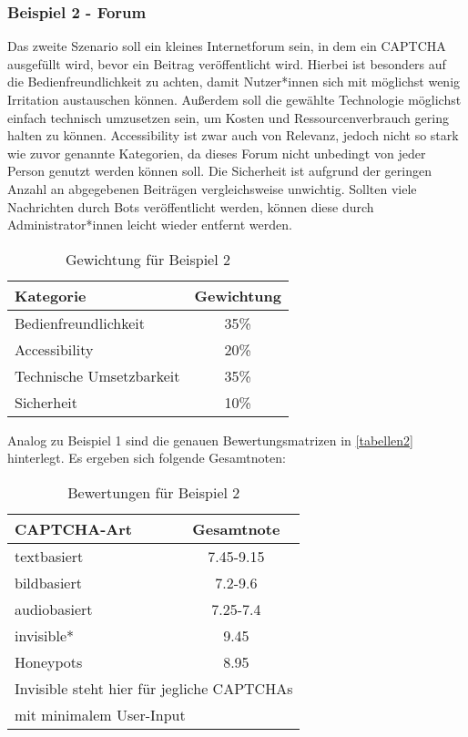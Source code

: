 \subsubsection*{Beispiel 2 - Forum}
Das zweite Szenario soll ein kleines Internetforum sein, in dem ein CAPTCHA ausgefüllt wird, bevor ein Beitrag veröffentlicht wird.
Hierbei ist besonders auf die Bedienfreundlichkeit zu achten, damit Nutzer*innen sich mit möglichst wenig Irritation austauschen können.
Außerdem soll die gewählte Technologie möglichst einfach technisch umzusetzen sein, um Kosten und Ressourcenverbrauch gering halten zu können.
Accessibility ist zwar auch von Relevanz, jedoch nicht so stark wie zuvor genannte Kategorien, da dieses Forum nicht unbedingt von jeder Person genutzt werden können soll.
Die Sicherheit ist aufgrund der geringen Anzahl an abgegebenen Beiträgen vergleichsweise unwichtig.
Sollten viele Nachrichten durch Bots veröffentlicht werden, können diese durch Administrator*innen leicht wieder entfernt werden.

\begin{table}[h!]
    \caption{Gewichtung für Beispiel 2}
    \begin{center}
        \begin{tabular}{l|c}
            Kategorie                       & Gewichtung \\\hline
            Bedienfreundlichkeit            & 35\%         \\
            Accessibility                   & 20\%        \\
            Technische Umsetzbarkeit        & 35\%         \\
            Sicherheit                      & 10\%         
        \end{tabular}
    \end{center}
\end{table}

Analog zu Beispiel 1 sind die genauen Bewertungsmatrizen in \autoref{tabellen2} hinterlegt.
Es ergeben sich folgende Gesamtnoten:

\begin{table}[h!]
    \caption{Bewertungen für Beispiel 2}
    \begin{center}
        \begin{tabular}{l|c}
            CAPTCHA-Art                       & Gesamtnote \\\hline
            textbasiert            & 7.45-9.15        \\
            bildbasiert                   & 7.2-9.6       \\
            audiobasiert        & 7.25-7.4         \\
            invisible*                      & 9.45         \\
            Honeypots & 8.95 \\
           \multicolumn{2}{l}{\footnotesize * Invisible steht hier für jegliche CAPTCHAs} \\
           \multicolumn{2}{l}{\footnotesize   \enspace mit minimalem User-Input}
        \end{tabular}
    \end{center}
\end{table}

